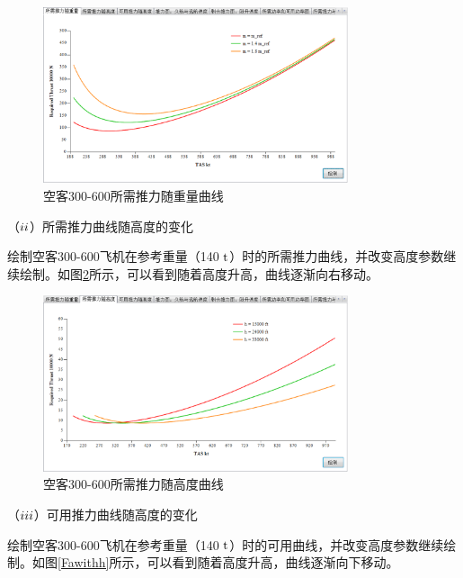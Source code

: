 \documentclass[a4paper,punct,space,heading=true,AutoFakeBold]{ctexrep}
\begin{document}
\begin{figure}[h]
	\centering
	\includegraphics[width=0.8\textwidth]{pic/FRwithW.eps}\hspace{30pt}
	\caption{空客300-600所需推力随重量曲线}\label{FRwithW}
\end{figure}

（$\romannumeral2$）所需推力曲线随高度的变化

绘制空客300-600飞机在参考重量（140 $\rm t$）时的所需推力曲线，并改变高度参数继续绘制。如图\ref{FRwithh}所示，可以看到随着高度升高，曲线逐渐向右移动。

\begin{figure}[h]
	\centering
	\includegraphics[width=0.8\textwidth]{pic/FRwithh.eps}\hspace{30pt}
	\caption{空客300-600所需推力随高度曲线}\label{FRwithh}
\end{figure}



（$\romannumeral3$）可用推力曲线随高度的变化

绘制空客300-600飞机在参考重量（140 $\rm t$）时的可用曲线，并改变高度参数继续绘制。如图\ref{Fawithh}所示，可以看到随着高度升高，曲线逐渐向下移动。
\end{document}
